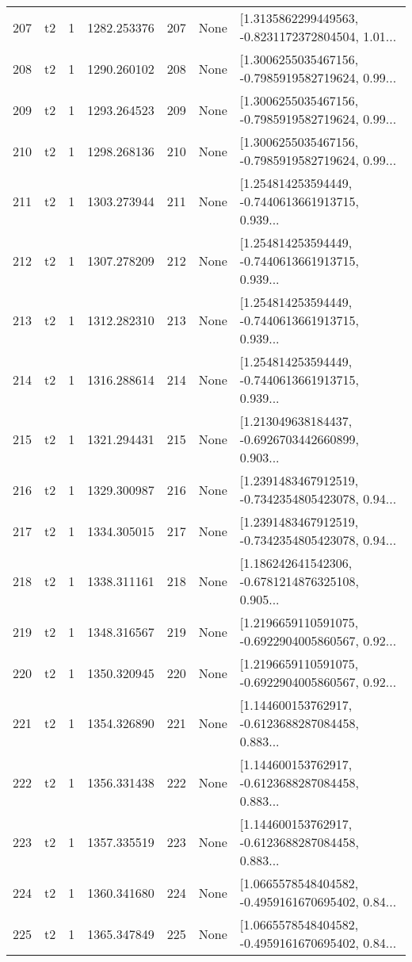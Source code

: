 \begin{tabular}{lllrlll}
207 &  t2 &   1 &  1282.253376 &  207 &  None &  [1.3135862299449563, -0.8231172372804504, 1.01... \\
208 &  t2 &   1 &  1290.260102 &  208 &  None &  [1.3006255035467156, -0.7985919582719624, 0.99... \\
209 &  t2 &   1 &  1293.264523 &  209 &  None &  [1.3006255035467156, -0.7985919582719624, 0.99... \\
210 &  t2 &   1 &  1298.268136 &  210 &  None &  [1.3006255035467156, -0.7985919582719624, 0.99... \\
211 &  t2 &   1 &  1303.273944 &  211 &  None &  [1.254814253594449, -0.7440613661913715, 0.939... \\
212 &  t2 &   1 &  1307.278209 &  212 &  None &  [1.254814253594449, -0.7440613661913715, 0.939... \\
213 &  t2 &   1 &  1312.282310 &  213 &  None &  [1.254814253594449, -0.7440613661913715, 0.939... \\
214 &  t2 &   1 &  1316.288614 &  214 &  None &  [1.254814253594449, -0.7440613661913715, 0.939... \\
215 &  t2 &   1 &  1321.294431 &  215 &  None &  [1.213049638184437, -0.6926703442660899, 0.903... \\
216 &  t2 &   1 &  1329.300987 &  216 &  None &  [1.2391483467912519, -0.7342354805423078, 0.94... \\
217 &  t2 &   1 &  1334.305015 &  217 &  None &  [1.2391483467912519, -0.7342354805423078, 0.94... \\
218 &  t2 &   1 &  1338.311161 &  218 &  None &  [1.186242641542306, -0.6781214876325108, 0.905... \\
219 &  t2 &   1 &  1348.316567 &  219 &  None &  [1.2196659110591075, -0.6922904005860567, 0.92... \\
220 &  t2 &   1 &  1350.320945 &  220 &  None &  [1.2196659110591075, -0.6922904005860567, 0.92... \\
221 &  t2 &   1 &  1354.326890 &  221 &  None &  [1.144600153762917, -0.6123688287084458, 0.883... \\
222 &  t2 &   1 &  1356.331438 &  222 &  None &  [1.144600153762917, -0.6123688287084458, 0.883... \\
223 &  t2 &   1 &  1357.335519 &  223 &  None &  [1.144600153762917, -0.6123688287084458, 0.883... \\
224 &  t2 &   1 &  1360.341680 &  224 &  None &  [1.0665578548404582, -0.4959161670695402, 0.84... \\
225 &  t2 &   1 &  1365.347849 &  225 &  None &  [1.0665578548404582, -0.4959161670695402, 0.84... \\

\end{tabular}
